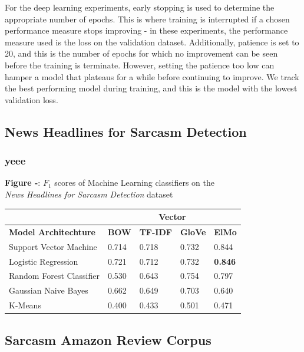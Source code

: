 \documentclass[12pt,a4paper]{article}
\begin{document}
For the deep learning experiments, early stopping is used to determine the appropriate number of epochs. This is where training is interrupted if a chosen performance measure stops improving - in these experiments, the performance measure used is the loss on the validation dataset. Additionally, patience is set to 20, and this is the number of epochs for which no improvement can be seen before the training is terminate. However, setting the patience too low can hamper a model that plateaus for a while before continuing to improve. We track the best performing model during training, and this is the model with the lowest validation loss.


\subsection{News Headlines for Sarcasm Detection}
\subsubsection{yeee}

\begin{center}
	\textbf{Figure -}: $F_1$ scores of Machine Learning classifiers on the \\\textit{News Headlines for Sarcasm Detection} dataset
\end{center}

\begin{center}
	\begin{tabular}{ |p{4.7cm}||p{1.2cm}|p{1.5cm}|p{1.2cm}|p{1.2cm}|  }
		\hline
		& \multicolumn{4}{|c|}{\textbf{Vector}} \\
		\hline
		\textbf{Model Architechture}& \textbf{BOW} & \textbf{TF-IDF} & \textbf{GloVe} & \textbf{ElMo}\\
		\hline\hline
		Support Vector Machine   & 0.714    & 0.718 &   0.732 & 0.844\\
		Logistic Regression &   0.721 & 0.712   & 0.732 & \textbf{0.846}\\
		Random Forest Classifier &0.530 & 0.643 &  0.754 & 0.797\\
		Gaussian Naive Bayes  & 0.662  & 0.649&  0.703 &0.640\\
		K-Means& 0.400  & 0.433   & 0.501 & 0.471\\
		\hline
	\end{tabular}
\end{center}


\subsection{Sarcasm Amazon Review Corpus}
\end{document}
